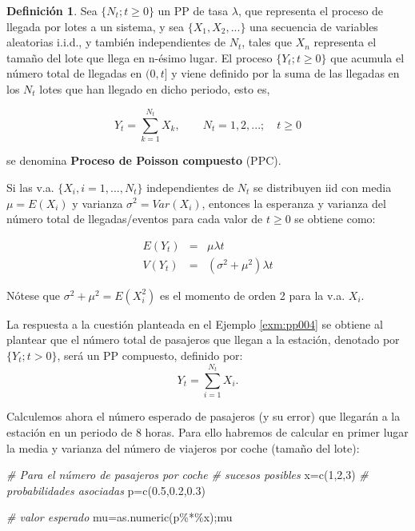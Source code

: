 \documentclass[
]{book}
\newenvironment{Shaded}{\begin{snugshade}}{\end{snugshade}}
\newcommand{\CommentTok}[1]{\textcolor[rgb]{0.56,0.35,0.01}{\textit{#1}}}
\newcommand{\DecValTok}[1]{\textcolor[rgb]{0.00,0.00,0.81}{#1}}
\newcommand{\FloatTok}[1]{\textcolor[rgb]{0.00,0.00,0.81}{#1}}
\newcommand{\FunctionTok}[1]{\textcolor[rgb]{0.00,0.00,0.00}{#1}}
\newcommand{\NormalTok}[1]{#1}
\newcommand{\OtherTok}[1]{\textcolor[rgb]{0.56,0.35,0.01}{#1}}
\newcommand{\SpecialCharTok}[1]{\textcolor[rgb]{0.00,0.00,0.00}{#1}}
\newenvironment{yellowbox}{
  \definecolor{shadecolor}{rgb}{210, 180, 140}  
  \color{black}
  \begin{shaded}}
 {\end{shaded}}
\theoremstyle{definition}
\newtheorem{definition}{Definición}[chapter]
\theoremstyle{definition}
\theoremstyle{definition}
\theoremstyle{definition}
\theoremstyle{remark}
\begin{document}
\begin{yellowbox}

\begin{definition}
\protect\hypertarget{def:ppcompuesto}{}\label{def:ppcompuesto}Sea \(\{N_t; t \geq 0\}\) un PP de tasa \(\lambda\), que representa el proceso de llegada por lotes a un sistema, y sea \(\{X_1, X_2,...\}\) una secuencia de variables aleatorias i.i.d., y también independientes de \(N_t\), tales que \(X_n\) representa el tamaño del lote que llega en n-ésimo lugar. El proceso \(\{Y_t; t \geq 0\}\) que acumula el número total de llegadas en \((0,t]\) y viene definido por la suma de las llegadas en los \(N_t\) lotes que han llegado en dicho periodo, esto es,

\begin{equation} 
Y_t = \sum_{k=1}^{N_t} X_k, \qquad N_t=1,2,...; \quad t\geq 0
\label{eq:ppc-ecu}
\end{equation}

se denomina \textbf{Proceso de Poisson compuesto} (PPC).

Si las v.a. \(\{X_i, i=1,...,N_t\}\) independientes de \(N_t\) se distribuyen iid con media \(\mu=E(X_i)\) y varianza \(\sigma^2=Var(X_i)\), entonces la esperanza y varianza del número total de llegadas/eventos para cada valor de \(t \geq 0\) se obtiene como:

\begin{eqnarray*}
E(Y_t) &=& \mu \lambda t \\
V(Y_t) &=& (\sigma^2+\mu^2) \lambda t
\end{eqnarray*}

Nótese que \(\sigma^2+\mu^2=E(X_i^2)\) es el momento de orden 2 para la v.a. \(X_i\).
\end{definition}

\end{yellowbox}

La respuesta a la cuestión planteada en el Ejemplo \ref{exm:pp004} se obtiene al plantear que el número total de pasajeros que llegan a la estación, denotado por \(\{Y_t; t > 0 \}\), será un PP compuesto, definido por: \[Y_t=\sum_{i=1}^{N_t} X_i.\]

Calculemos ahora el número esperado de pasajeros (y su error) que llegarán a la estación en un periodo de 8 horas. Para ello habremos de calcular en primer lugar la media y varianza del número de viajeros por coche (tamaño del lote):

\begin{Shaded}
\begin{Highlighting}[]
\CommentTok{\# Para el número de pasajeros por coche}
\CommentTok{\# sucesos posibles}
\NormalTok{x}\OtherTok{=}\FunctionTok{c}\NormalTok{(}\DecValTok{1}\NormalTok{,}\DecValTok{2}\NormalTok{,}\DecValTok{3}\NormalTok{)}
\CommentTok{\# probabilidades asociadas}
\NormalTok{p}\OtherTok{=}\FunctionTok{c}\NormalTok{(}\FloatTok{0.5}\NormalTok{,}\FloatTok{0.2}\NormalTok{,}\FloatTok{0.3}\NormalTok{)}

\CommentTok{\# valor esperado}
\NormalTok{mu}\OtherTok{=}\FunctionTok{as.numeric}\NormalTok{(p}\SpecialCharTok{\%*\%}\NormalTok{x);mu}
\end{Highlighting}
\end{Shaded}
\end{document}
